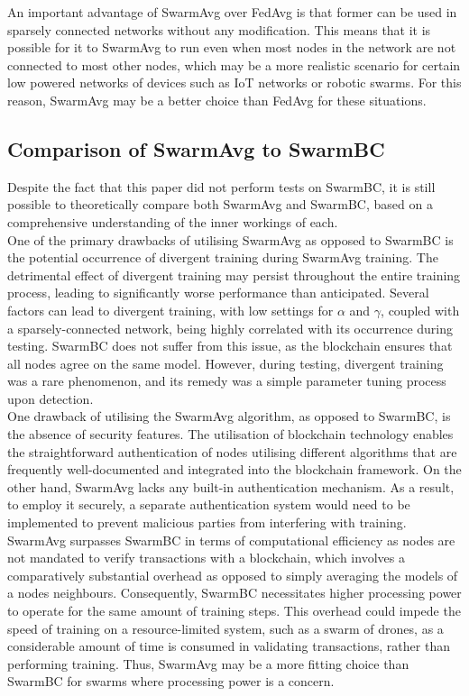\documentclass[letterpaper, 10 pt, conference]{ieeeconf}  %
\begin{document}
An important advantage of SwarmAvg over FedAvg is that former can be used in sparsely connected networks without any modification. This means that it is possible for it to SwarmAvg to run even when most nodes in the network are not connected to most other nodes, which may be a more realistic scenario for certain low powered networks of devices such as IoT networks or robotic swarms. For this reason, SwarmAvg may be a better choice than FedAvg for these situations.

\subsection{Comparison of SwarmAvg to SwarmBC}
Despite the fact that this paper did not perform tests on SwarmBC, it is still possible to theoretically compare both SwarmAvg and SwarmBC, based on a comprehensive understanding of the inner workings of each. \\

One of the primary drawbacks of utilising SwarmAvg as opposed to SwarmBC is the potential occurrence of divergent training during SwarmAvg training. The detrimental effect of divergent training may persist throughout the entire training process, leading to significantly worse performance than anticipated. Several factors can lead to divergent training, with low settings for $\alpha$ and $\gamma$, coupled with a sparsely-connected network, being highly correlated with its occurrence during testing. SwarmBC does not suffer from this issue, as the blockchain ensures that all nodes agree on the same model. However, during testing, divergent training was a rare phenomenon, and its remedy was a simple parameter tuning process upon detection. \\

One drawback of utilising the SwarmAvg algorithm, as opposed to SwarmBC, is the absence of security features. The utilisation of blockchain technology enables the straightforward authentication of nodes utilising different algorithms that are frequently well-documented and integrated into the blockchain framework. On the other hand, SwarmAvg lacks any built-in authentication mechanism. As a result, to employ it securely, a separate authentication system would need to be implemented to prevent malicious parties from interfering with training. \\

SwarmAvg surpasses SwarmBC in terms of computational efficiency as nodes are not mandated to verify transactions with a blockchain, which involves a comparatively substantial overhead as opposed to simply averaging the models of a nodes neighbours. Consequently, SwarmBC necessitates higher processing power to operate for the same amount of training steps. This overhead could impede the speed of training on a resource-limited system, such as a swarm of drones, as a considerable amount of time is consumed in validating transactions, rather than performing training. Thus, SwarmAvg may be a more fitting choice than SwarmBC for swarms where processing power is a concern.
\end{document}
